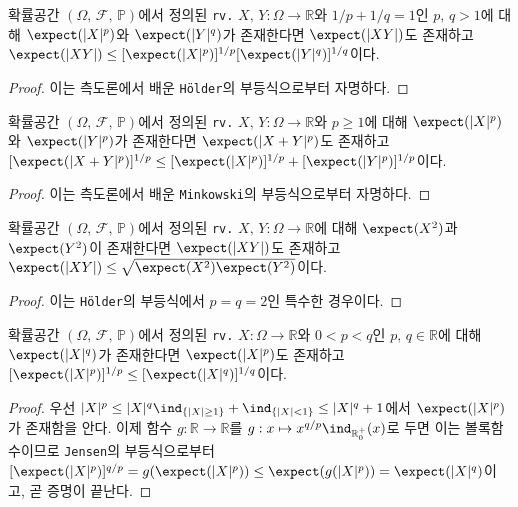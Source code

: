 \begin{theorem}
    확률공간 $(\Omega,\,\mathcal{F},\,\mathbb{P})$에서 정의된 \texttt{rv.} $X,\,Y:\Omega\to\mathbb{R}$와 $1/p+1/q=1$인 $p,\,q>1$에 대해 $\expect(|X|^p)$와 $\expect(|Y|^q)$가 존재한다면 $\expect(|XY|)$도 존재하고 $\expect(|XY|)\leq[\expect(|X|^p)]^{1/p}[\expect(|Y|^q)]^{1/q}$이다.
\end{theorem}

\begin{proof}
    이는 측도론에서 배운 \texttt{H\"older}의 부등식으로부터 자명하다.
\end{proof}

\begin{theorem}
    확률공간 $(\Omega,\,\mathcal{F},\,\mathbb{P})$에서 정의된 \texttt{rv.} $X,\,Y:\Omega\to\mathbb{R}$와 $p\geq1$에 대해 $\expect(|X|^p)$와 $\expect(|Y|^p)$가 존재한다면 $\expect(|X+Y|^p)$도 존재하고 $[\expect(|X+Y|^p)]^{1/p}\leq[\expect(|X|^p)]^{1/p}+[\expect(|Y|^p)]^{1/p}$이다.
\end{theorem}

\begin{proof}
    이는 측도론에서 배운 \texttt{Minkowski}의 부등식으로부터 자명하다.
\end{proof}

\begin{corollary}
    확률공간 $(\Omega,\,\mathcal{F},\,\mathbb{P})$에서 정의된 \texttt{rv.} $X,\,Y:\Omega\to\mathbb{R}$에 대해 $\expect(X^2)$과 $\expect(Y^2)$이 존재한다면 $\expect(|XY|)$도 존재하고 $\expect(|XY|)\leq\sqrt{\expect(X^2)\expect(Y^2)}$이다.
\end{corollary}

\begin{proof}
    이는 \texttt{H\"older}의 부등식에서 $p=q=2$인 특수한 경우이다.
\end{proof}

\begin{theorem}
    확률공간 $(\Omega,\,\mathcal{F},\,\mathbb{P})$에서 정의된 \texttt{rv.} $X:\Omega\to\mathbb{R}$와 $0<p<q$인 $p,\,q\in\mathbb{R}$에 대해 $\expect(|X|^q)$가 존재한다면 $\expect(|X|^p)$도 존재하고 $[\expect(|X|^p)]^{1/p}\leq[\expect(|X|^q)]^{1/q}$이다.
\end{theorem}

\begin{proof}
    우선 $|X|^p\leq|X|^q\ind_{\{|X|\geq1\}}+\ind_{\{|X|<1\}}\leq|X|^q+1$에서 $\expect(|X|^p)$가 존재함을 안다. 이제 함수 $g:\mathbb{R}\to\mathbb{R}$를 $g:x\mapsto x^{q/p}\ind_{\mathbb{R}_0^+}(x)$로 두면 이는 볼록함수이므로 \texttt{Jensen}의 부등식으로부터 $[\expect(|X|^p)]^{q/p}=g(\expect(|X|^p))\leq\expect(g(|X|^p))=\expect(|X|^q)$이고, 곧 증명이 끝난다.
\end{proof}

